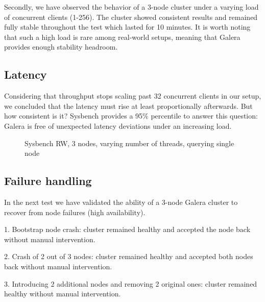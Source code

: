 \documentclass{sig-alternate}
\begin{document}
Secondly, we have observed the behavior of a 3-node cluster under a varying load of concurrent clients (1-256). The cluster showed consistent results and remained fully stable throughout the test which lasted for 10 minutes. It is worth noting that such a high load is rare among real-world setups, meaning that Galera provides enough stability headroom.

\subsection{Latency}

Considering that throughput stops scaling past 32 concurrent clients in our setup, we concluded that the latency must rise at least proportionally afterwards. But how consistent is it? Sysbench provides a 95\% percentile to answer this question: Galera is free of unexpected latency deviations under an increasing load.

\begin{figure}[h]
\centering
{}
\caption{Sysbench RW, 3 nodes, varying number of threads, querying single node}
\end{figure}

\subsection{Failure handling}

In the next test we have validated the ability of a 3-node Galera cluster to recover from node failures (high availability).

1. Bootstrap node crash: cluster remained healthy and accepted the node back without manual intervention.

2. Crash of 2 out of 3 nodes: cluster remained healthy and accepted both nodes back without manual intervention.

3. Introducing 2 additional nodes and removing 2 original ones: cluster remained healthy without manual intervention.
\end{document}
